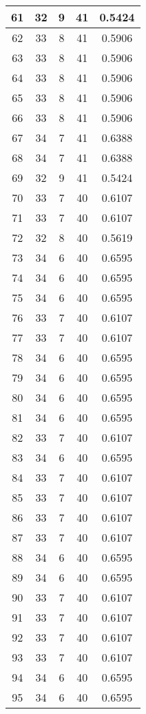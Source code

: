 \documentclass[letterpaper, 12pt]{article}
\begin{document}
\begin{longtable}{|c|c|c|c|c|}
\hline
61 & 32 & 9 & 41 & 0.5424 \\
\hline
62 & 33 & 8 & 41 & 0.5906 \\
\hline
63 & 33 & 8 & 41 & 0.5906 \\
\hline
64 & 33 & 8 & 41 & 0.5906 \\
\hline
65 & 33 & 8 & 41 & 0.5906 \\
\hline
66 & 33 & 8 & 41 & 0.5906 \\
\hline
67 & 34 & 7 & 41 & 0.6388 \\
\hline
68 & 34 & 7 & 41 & 0.6388 \\
\hline
69 & 32 & 9 & 41 & 0.5424 \\
\hline
70 & 33 & 7 & 40 & 0.6107 \\
\hline
71 & 33 & 7 & 40 & 0.6107 \\
\hline
72 & 32 & 8 & 40 & 0.5619 \\
\hline
73 & 34 & 6 & 40 & 0.6595 \\
\hline
74 & 34 & 6 & 40 & 0.6595 \\
\hline
75 & 34 & 6 & 40 & 0.6595 \\
\hline
76 & 33 & 7 & 40 & 0.6107 \\
\hline
77 & 33 & 7 & 40 & 0.6107 \\
\hline
78 & 34 & 6 & 40 & 0.6595 \\
\hline
79 & 34 & 6 & 40 & 0.6595 \\
\hline
80 & 34 & 6 & 40 & 0.6595 \\
\hline
81 & 34 & 6 & 40 & 0.6595 \\
\hline
82 & 33 & 7 & 40 & 0.6107 \\
\hline
83 & 34 & 6 & 40 & 0.6595 \\
\hline
84 & 33 & 7 & 40 & 0.6107 \\
\hline
85 & 33 & 7 & 40 & 0.6107 \\
\hline
86 & 33 & 7 & 40 & 0.6107 \\
\hline
87 & 33 & 7 & 40 & 0.6107 \\
\hline
88 & 34 & 6 & 40 & 0.6595 \\
\hline
89 & 34 & 6 & 40 & 0.6595 \\
\hline
90 & 33 & 7 & 40 & 0.6107 \\
\hline
91 & 33 & 7 & 40 & 0.6107 \\
\hline
92 & 33 & 7 & 40 & 0.6107 \\
\hline
93 & 33 & 7 & 40 & 0.6107 \\
\hline
94 & 34 & 6 & 40 & 0.6595 \\
\hline
95 & 34 & 6 & 40 & 0.6595 \\

\end{longtable}
\end{document}
